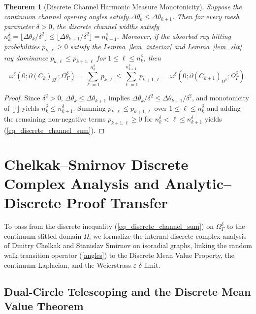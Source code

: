 \documentclass[11pt,reqno]{amsart}
\newtheorem{thm}{Theorem}[section]
\numberwithin{equation}{section}
\newcommand{\eps}{\varepsilon}
\begin{document}
\begin{thm}[Discrete Channel Harmonic Measure Monotonicity] \label{thm_discrete_channel_mono}
Suppose the continuum channel opening angles satisfy $\Delta\theta_k \le \Delta\theta_{k+1}$. Then for every mesh parameter $\delta > 0$, the discrete channel widths satisfy $n_k^{\delta} = \lfloor \Delta\theta_k / \delta^2 \rfloor \le \lfloor \Delta\theta_{k+1} / \delta^2 \rfloor = n_{k+1}^{\delta}$. Moreover, if the absorbed ray hitting probabilities $p_{k,\ell} \ge 0$ satisfy the Lemma~\ref{lem_interior} and Lemma~\ref{lem_slit} ray dominance $p_{k,\ell} \le p_{k+1,\ell}$ for $1 \le \ell \le n_k^{\delta}$, then
\begin{equation} \label{eq_discrete_channel_sum}
  \omega^{\delta}(0 ; \partial (C_k)_{\Omega^{\delta}}; \varOmega^{\delta}_{\varGamma})
  = \sum_{\ell=1}^{n_k^{\delta}} p_{k,\ell}
  \le \sum_{\ell=1}^{n_{k+1}^{\delta}} p_{k+1,\ell}
  = \omega^{\delta}(0 ; \partial (C_{k+1})_{\Omega^{\delta}}; \varOmega^{\delta}_{\varGamma}).
\end{equation}
\end{thm}
\begin{proof}
Since $\delta^2 > 0$, $\Delta\theta_k \le \Delta\theta_{k+1}$ implies $\Delta\theta_k / \delta^2 \le \Delta\theta_{k+1} / \delta^2$, and monotonicity of $\lfloor \cdot \rfloor$ yields $n_k^{\delta} \le n_{k+1}^{\delta}$. Summing $p_{k,\ell} \le p_{k+1,\ell}$ over $1 \le \ell \le n_k^{\delta}$ and adding the remaining non-negative terms $p_{k+1,\ell} \ge 0$ for $n_k^{\delta} < \ell \le n_{k+1}^{\delta}$ yields (\ref{eq_discrete_channel_sum}).
\end{proof}

\section{Chelkak--Smirnov Discrete Complex Analysis and Analytic--Discrete Proof Transfer}

To pass from the discrete inequality (\ref{eq_discrete_channel_sum}) on $\varOmega_{\varGamma}^{\delta}$ to the continuum slitted domain $\varOmega$, we formalize the internal discrete complex analysis of Dmitry Chelkak and Stanislav Smirnov \cite{CS} on isoradial graphs, linking the random walk transition operator (\ref{angles}) to the Discrete Mean Value Property, the continuum Laplacian, and the Weierstrass $\eps$-$\delta$ limit.

\subsection{Dual-Circle Telescoping and the Discrete Mean Value Theorem}
\end{document}
